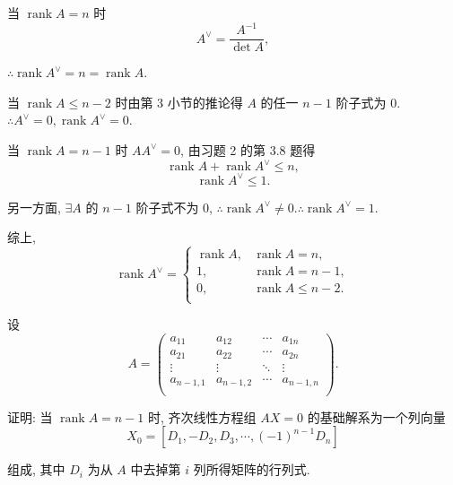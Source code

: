 \documentclass{ctexart}
\begin{document}
\begin{solution}
    当 $\operatorname{rank}A=n$ 时
    \[A^\vee=\dfrac{A^{-1}}{\det A},\]

    $\therefore\operatorname{rank}A^\vee=n=\operatorname{rank}A$.

    当 $\operatorname{rank}A\leq n-2$ 时由第 3 小节的推论得 $A$ 的任一 $n-1$ 阶子式为 $0$. $\therefore A^\vee=0,\operatorname{rank}A^\vee=0$.

    当 $\operatorname{rank}A=n-1$ 时 $AA^\vee=0$, 由习题 2 的第 3.8 题得
    \[\operatorname{rank}A+\operatorname{rank}A^\vee\leq n,\]
    \[\operatorname{rank}A^\vee\leq1.\]

    另一方面, $\exists A$ 的 $n-1$ 阶子式不为 $0$, $\therefore\operatorname{rank}A^\vee\neq0.\therefore\operatorname{rank}A^\vee=1$.

    综上,
    \[\operatorname{rank}A^\vee=\begin{cases}
        \operatorname{rank}A, & \operatorname{rank}A=n, \\
        1, & \operatorname{rank}A=n-1, \\
        0, & \operatorname{rank}A\leq n-2. \\
    \end{cases}\]
\end{solution}
\begin{exercise}[3.4]
    设
    \[A=\begin{pmatrix}
        a_{11} & a_{12} & \cdots & a_{1n} \\
        a_{21} & a_{22} & \cdots & a_{2n} \\
        \vdots & \vdots & \ddots & \vdots \\
        a_{n-1,1} & a_{n-1,2} & \cdots & a_{n-1,n} \\
    \end{pmatrix}.\]

    证明: 当 $\operatorname{rank}A=n-1$ 时, 齐次线性方程组 $AX=0$ 的基础解系为一个列向量
    \[X_0=[D_1,-D_2,D_3,\cdots,(-1)^{n-1}D_n]\]

    组成, 其中 $D_i$ 为从 $A$ 中去掉第 $i$ 列所得矩阵的行列式.
\end{exercise}
\end{document}
